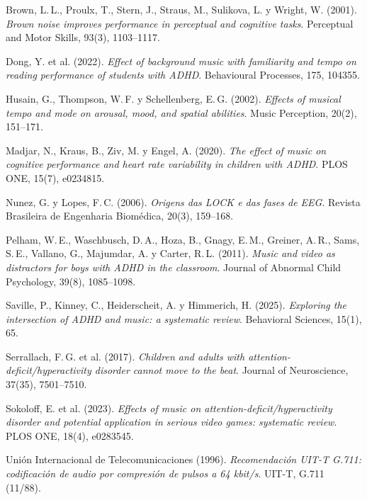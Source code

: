 \documentclass[11pt,a4paper]{article}
\begin{document}
\begin{enumerate}[label={[\arabic*]},leftmargin=2.4em]
  \item Brown, L.\,L., Proulx, T., Stern, J., Straus, M., Sulikova, L. y
        Wright, W. (2001). \emph{Brown noise improves performance in perceptual
        and cognitive tasks}. Perceptual and Motor Skills, 93(3), 1103--1117.

  \item Dong, Y. et al. (2022). \emph{Effect of background music with
        familiarity and tempo on reading performance of students with ADHD}.
        Behavioural Processes, 175, 104355.

  \item Husain, G., Thompson, W.\,F. y Schellenberg, E.\,G. (2002).
        \emph{Effects of musical tempo and mode on arousal, mood, and spatial
        abilities}. Music Perception, 20(2), 151--171.

  \item Madjar, N., Kraus, B., Ziv, M. y Engel, A. (2020). \emph{The effect of
        music on cognitive performance and heart rate variability in children
        with ADHD}. PLOS ONE, 15(7), e0234815.

  \item Nunez, G. y Lopes, F.\,C. (2006). \emph{Origens das LOCK e das fases de
        EEG}. Revista Brasileira de Engenharia Biomédica, 20(3), 159--168.

  \item Pelham, W.\,E., Waschbusch, D.\,A., Hoza, B., Gnagy, E.\,M., Greiner,
        A.\,R., Sams, S.\,E., Vallano, G., Majumdar, A. y Carter, R.\,L.
        (2011). \emph{Music and video as distractors for boys with ADHD in the
        classroom}. Journal of Abnormal Child Psychology, 39(8), 1085--1098.

  \item Saville, P., Kinney, C., Heiderscheit, A. y Himmerich, H. (2025).
        \emph{Exploring the intersection of ADHD and music: a systematic
        review}. Behavioral Sciences, 15(1), 65.

  \item Serrallach, F.\,G. et al. (2017). \emph{Children and adults with
        attention-deficit/hyperactivity disorder cannot move to the beat}.
        Journal of Neuroscience, 37(35), 7501--7510.

  \item Sokoloff, E. et al. (2023). \emph{Effects of music on
        attention-deficit/hyperactivity disorder and potential application in
        serious video games: systematic review}. PLOS ONE, 18(4), e0283545.

  \item Unión Internacional de Telecomunicaciones (1996). \emph{Recomendación
        UIT-T G.711: codificación de audio por compresión de pulsos a
        64 kbit/s}. UIT-T, G.711 (11/88).
\end{enumerate}
\end{document}
